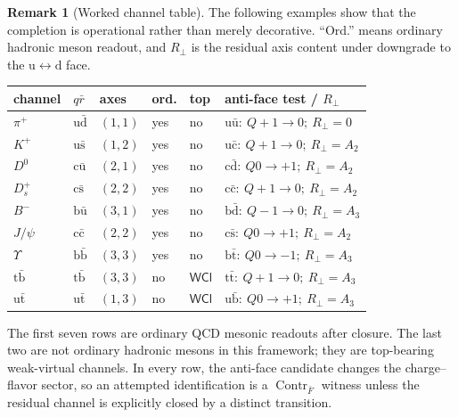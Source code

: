 \documentclass[11pt]{article}
\theoremstyle{definition}
\newtheorem{remark}[definition]{Remark}
\theoremstyle{plain}
\DeclareMathOperator{\Contr}{Contr}
\newcommand{\qu}{\mathrm u}
\newcommand{\qd}{\mathrm d}
\newcommand{\qc}{\mathrm c}
\newcommand{\qs}{\mathrm s}
\newcommand{\qt}{\mathrm t}
\newcommand{\qb}{\mathrm b}
\begin{document}
\begin{remark}[Worked channel table]
The following examples show that the completion is operational rather than
merely decorative.  ``Ord.'' means ordinary hadronic meson readout, and
\(R_{\perp}\) is the residual axis content under downgrade to the
\(\qu\leftrightarrow\qd\) face.
\begin{center}
\small
\begin{tabular}{@{}llllll@{}}
channel & \(q\bar r\) & axes & ord. & top & anti-face test / \(R_{\perp}\)\\
\hline
\(\pi^+\) & \(\qu\bar{\qd}\) & \((1,1)\) & yes & no
  & \(\qu\bar{\qu}:\ Q +1\to0;\ R_{\perp}=0\)\\
\(K^+\) & \(\qu\bar{\qs}\) & \((1,2)\) & yes & no
  & \(\qu\bar{\qc}:\ Q +1\to0;\ R_{\perp}=A_2\)\\
\(D^0\) & \(\qc\bar{\qu}\) & \((2,1)\) & yes & no
  & \(\qc\bar{\qd}:\ Q 0\to+1;\ R_{\perp}=A_2\)\\
\(D_s^+\) & \(\qc\bar{\qs}\) & \((2,2)\) & yes & no
  & \(\qc\bar{\qc}:\ Q +1\to0;\ R_{\perp}=A_2\)\\
\(B^-\) & \(\qb\bar{\qu}\) & \((3,1)\) & yes & no
  & \(\qb\bar{\qd}:\ Q -1\to0;\ R_{\perp}=A_3\)\\
\(J/\psi\) & \(\qc\bar{\qc}\) & \((2,2)\) & yes & no
  & \(\qc\bar{\qs}:\ Q 0\to+1;\ R_{\perp}=A_2\)\\
\(\Upsilon\) & \(\qb\bar{\qb}\) & \((3,3)\) & yes & no
  & \(\qb\bar{\qt}:\ Q 0\to-1;\ R_{\perp}=A_3\)\\
\(\qt\bar{\qb}\) & \(\qt\bar{\qb}\) & \((3,3)\) & no & \(\mathsf{WCl}\)
  & \(\qt\bar{\qt}:\ Q +1\to0;\ R_{\perp}=A_3\)\\
\(\qu\bar{\qt}\) & \(\qu\bar{\qt}\) & \((1,3)\) & no & \(\mathsf{WCl}\)
  & \(\qu\bar{\qb}:\ Q 0\to+1;\ R_{\perp}=A_3\)
\end{tabular}
\end{center}
The first seven rows are ordinary QCD mesonic readouts after closure.  The
last two are not ordinary hadronic mesons in this framework; they are
top-bearing weak-virtual channels.  In every row, the anti-face candidate
changes the charge--flavor sector, so an attempted identification is a
\(\Contr_{\bar F}\) witness unless the residual channel is explicitly
closed by a distinct transition.
\end{remark}
\end{document}
